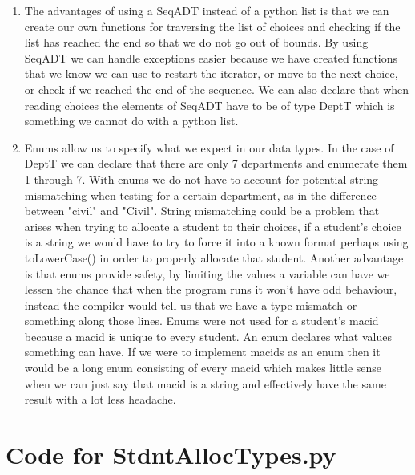 \documentclass[12pt]{article}
\begin{document}
\begin{enumerate}[a]
\item The advantages of using a SeqADT instead of a python list is that we can create our own functions for traversing the list of choices
and checking if the list has reached the end so that we do not go out of bounds. By using SeqADT we can handle exceptions easier because we
have created functions that we know we can use to restart the iterator, or move to the next choice, or check if we reached the end of the 
sequence. We can also declare that when reading choices the elements of SeqADT have to be of type DeptT which is something we cannot do 
with a python list. 

\item Enums allow us to specify what we expect in our data types. In the case of DeptT we can declare that there are only 7 departments and 
enumerate them 1 through 7. With enums we do not have to account for potential string mismatching when testing for a certain department, as in
the difference between "civil" and "Civil". String mismatching could be a problem that arises when trying to allocate a student to their
choices, if a student's choice is a string we would have to try to force it into a known format perhaps using toLowerCase() in order to properly
allocate that student. Another advantage is that enums provide safety, by limiting the values a variable can have we lessen the chance that when
the program runs it won't have odd behaviour, instead the compiler would tell us that we have a type mismatch or something along those lines.
Enums were not used for a student's macid because a macid is unique to every student. An enum declares what values something can have. If we 
were to implement macids as an enum then it would be a long enum consisting of every macid which makes little sense when we can just say that 
macid is a string and effectively have the same result with a lot less headache.

\end{enumerate}

\newpage

\lstset{language=Python, basicstyle=\tiny, breaklines=true, showspaces=false,
  showstringspaces=false, breakatwhitespace=true}

\def\thesection{\Alph{section}}

\section{Code for StdntAllocTypes.py}
\end{document}
